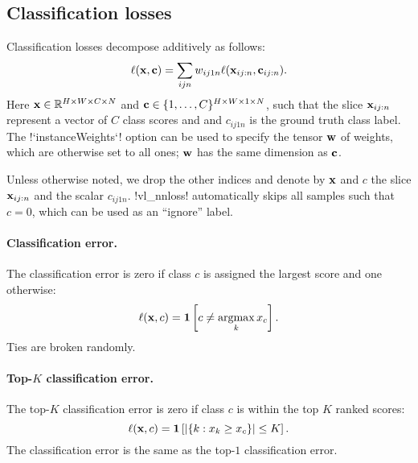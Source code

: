 \subsection{Classification losses}\label{s:loss-classification}

Classification losses decompose additively as follows:
\begin{equation}\label{e:addloss}
\ell(\mathbf{x},\mathbf{c}) = \sum_{ijn} w_{ij1n} \ell(\mathbf{x}_{ij:n}, \mathbf{c}_{ij:n}).
\end{equation}
Here $\mathbf{x} \in \mathbb{R}^{H \times W \times C \times N}$ and $\mathbf{c} \in \{1, \dots, C\}^{H \times W \times 1 \times N}$, such that the slice $\mathbf{x}_{ij:n}$ represent a vector of $C$ class scores and and $c_{ij1n}$ is the ground truth class label. The !`instanceWeights`! option can be used to specify the tensor $\mathbf{w}$ of weights, which are otherwise set to all ones; $\mathbf{w}$ has the same dimension as $\mathbf{c}$.

Unless otherwise noted, we drop the other indices and denote by $\mathbf{x}$ and $c$  the slice $\mathbf{x}_{ij:n}$ and the scalar $c_{ij1n}$. !vl_nnloss! automatically skips all samples such that $c=0$, which can be used as an ``ignore'' label.

\paragraph{Classification error.} The classification error is zero if class $c$ is assigned the largest score and one otherwise:
\begin{equation}\label{e:loss-classerror}
\ell(\bx,c) = \mathbf{1}\left[c \not= \argmax_k x_c\right].
\end{equation}
Ties are broken randomly.

\paragraph{Top-$K$ classification error.} The top-$K$ classification error is zero if class $c$ is within the top $K$ ranked scores:
\begin{equation}\label{e:loss-classerror}
\ell(\mathbf{x},c) = \mathbf{1}\left[ |\{k : x_k \geq x_c \}| \leq K \right].
\end{equation}
The classification error is the same as the top-$1$ classification error.

